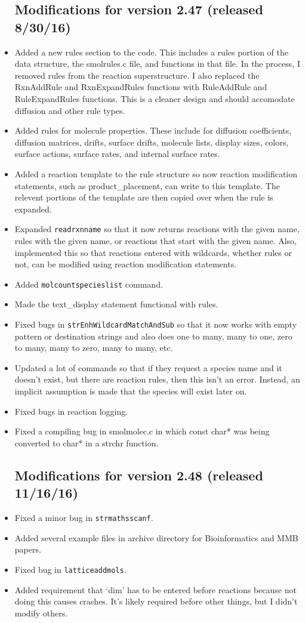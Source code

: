 \documentclass {scrbook}
\newcommand {\ttt} {\texttt}
\begin{document}
\begin{itemize}
\subsection{Modifications for version 2.47 (released 8/30/16)}
\item Added a new rules section to the code. This includes a rules portion of the data structure, the smolrules.c file, and functions in that file. In the process, I removed rules from the reaction superstructure. I also replaced the RxnAddRule and RxnExpandRules functions with RuleAddRule and RuleExpandRules functions. This is a cleaner design and should accomodate diffusion and other rule types.
\item Added rules for molecule properties. These include for diffusion coefficients, diffusion matrices, drifts, surface drifts, molecule lists, display sizes, colors, surface actions, surface rates, and internal surface rates.
\item Added a reaction template to the rule structure so now reaction modification statements, such as product\_placement, can write to this template. The relevent portions of the template are then copied over when the rule is expanded.
\item Expanded \ttt{readrxnname} so that it now returns reactions with the given name, rules with the given name, or reactions that start with the given name. Also, implemented this so that reactions entered with wildcards, whether rules or not, can be modified using reaction modification statements.
\item Added \ttt{molcountspecieslist} command.
\item Made the text\_display statement functional with rules.
\item Fixed bugs in \ttt{strEnhWildcardMatchAndSub} so that it now works with empty pattern or destination strings and also does one to many, many to one, zero to many, many to zero, many to many, etc.
\item Updated a lot of commands so that if they request a species name and it doesn't exist, but there are reaction rules, then this isn't an error. Instead, an implicit assumption is made that the species will exist later on.
\item Fixed bugs in reaction logging.
\item Fixed a compiling bug in smolmolec.c in which const char* was being converted to char* in a strchr function.

\subsection{Modifications for version 2.48 (released 11/16/16)}
\item Fixed a minor bug in \ttt{strmathsscanf}.
\item Added several example files in archive directory for Bioinformatics and MMB papers.
\item Fixed bug in \ttt{latticeaddmols}.
\item Added requirement that `dim' has to be entered before reactions because not doing this causes crashes. It's likely required before other things, but I didn't modify others.


\end{itemize}
\end{document}
